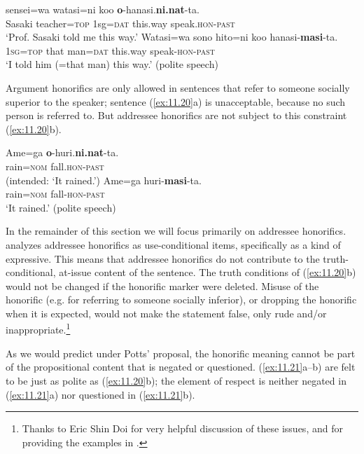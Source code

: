 \ea \label{ex:11.19}
\ea   {}  sensei=wa  watasi=ni  koo  \textbf{o}-hanasi.\textbf{ni.nat}-ta.\\
{Sasaki}  teacher=\textsc{top}  1sg=\textsc{dat}  this.way  speak.\textsc{hon-past}\\
\glt ‘Prof. {Sasaki} told me this way.’  \citep[501]{Harada1976}
\ex \gll
    Watasi=wa  sono  hito=ni  koo  hanasi-\textbf{masi}-ta.\\
\textsc{1sg}=\textsc{top}  that  man=\textsc{dat}  this.way  speak-\textsc{hon-past}\\
\glt ‘I told him (=that man) this way.’  (polite speech)   \citep[502]{Harada1976}
\z \z


Argument honorifics are only allowed in sentences that refer to someone socially superior to the speaker; sentence (\ref{ex:11.20}a) is unacceptable, because no such person is referred to. But addressee honorifics are not subject to this constraint (\ref{ex:11.20}b).


\ea \label{ex:11.20} \ea  \gll *Ame=ga  \textbf{o}-huri.\textbf{ni.nat}-ta.\\
  rain=\textsc{nom}  fall.\textsc{hon-past}\\
\glt (intended: ‘It rained.’)  \citep[502]{Harada1976}
\ex \gll
Ame=ga  huri-\textbf{masi}-ta.\\
rain=\textsc{nom}  fall-\textsc{hon-past}\\
\glt ‘It rained.’  (polite speech)   \citep[502]{Harada1976}
\z \z


In the remainder of this section we will focus primarily on addressee honorifics. \citet{Potts2005} analyzes addressee honorifics as use-conditional items, specifically as a kind of expressive. This means that addressee honorifics do not contribute to the truth-conditional, at-issue content of the sentence. The truth conditions of (\ref{ex:11.20}b) would not be changed if the honorific marker were deleted. Misuse of the honorific (e.g. for referring to someone socially inferior), or dropping the honorific when it is expected, would not make the statement false, only rude and/or inappropriate.\footnote{Thanks to Eric Shin Doi for very helpful discussion of these issues, and for providing the examples in .}



As we would predict under Potts’ proposal, the honorific meaning cannot be part of the propositional content that is negated or questioned. (\ref{ex:11.21}a--b) are felt to be just as polite as (\ref{ex:11.20}b); the element of respect is neither negated in (\ref{ex:11.21}a) nor questioned in (\ref{ex:11.21}b).



